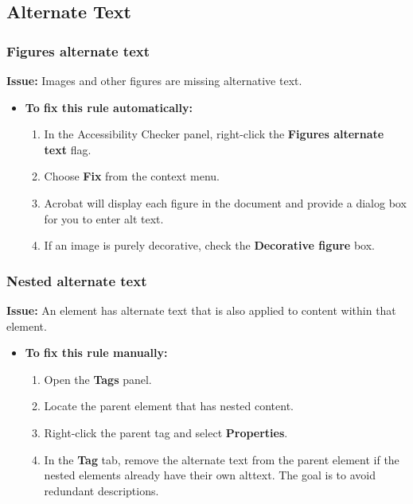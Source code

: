 \subsection{Alternate Text}
\label{subsec:pdf-alternate-text}

\subsubsection{Figures alternate text}
\label{ssubsec:pdf-figures-alt-text}

\textbf{Issue:} Images and other figures are missing alternative text.

\begin{itemize}
	\item \textbf{To fix this rule automatically:}
	      \begin{enumerate}
		      \item In the Accessibility Checker panel, right-click the \textbf{Figures alternate text} flag.
		      \item Choose \textbf{Fix} from the context menu.
		      \item Acrobat will display each figure in the document and provide a dialog box for you to enter alt text.
		      \item If an image is purely decorative, check the \textbf{Decorative figure} box.
	      \end{enumerate}
\end{itemize}

\subsubsection{Nested alternate text}
\label{ssubsec:pdf-nested-alt-text}

\textbf{Issue:} An element has alternate text that is also applied to content within that element.

\begin{itemize}
	\item \textbf{To fix this rule manually:}
	      \begin{enumerate}
		      \item Open the \textbf{Tags} panel.
		      \item Locate the parent element that has nested content.
		      \item Right-click the parent tag and select \textbf{Properties}.
		      \item In the \textbf{Tag} tab, remove the alternate text from the parent element if the nested elements already have their own \gls{alttext}. The goal is to avoid redundant descriptions.
	      \end{enumerate}
\end{itemize}

